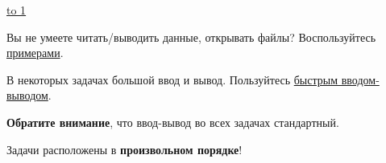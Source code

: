 \documentclass[12pt,a4paper,oneside]{article}
\renewcommand{\t}{\texttt}
\def\t{\texttt}
\def\LINE{\vspace*{-1em}\noindent \underline{\hbox to 1\textwidth{{ } \hfil{ } \hfil{ } }}}
\begin{document}
\vspace*{-2.8em}

\tableofcontents

\vspace*{0.8em}
\LINE
\vspace*{0.8em}


\noindent{}Вы не умеете читать/выводить данные, открывать файлы? Воспользуйтесь
\href{http://acm.math.spbu.ru/~sk1/algo/sum/}{примерами}.
\vspace{0.6em}

\noindent{}В некоторых задачах большой ввод и вывод.
Пользуйтесь \href{http://acm.math.spbu.ru/~sk1/algo/input-output/fread\_write\_export.cpp.html}{быстрым вводом-выводом}.

\vspace{0.6em}
\noindent{}\textbf{Обратите внимание}, что ввод-вывод во всех задачах стандартный.

\vspace{0.6em}
\noindent{}Задачи расположены в \textbf{произвольном порядке}!



\pagebreak


\end{document}
